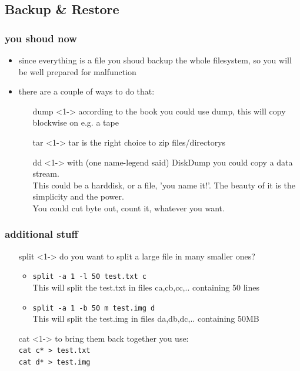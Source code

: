 \documentclass[draft,handout]{beamer}
\newcommand{\code}[1]{\colorbox{lGray}{\texttt{#1}}}
\begin{document}
    \subsection{Backup \& Restore}
	    \begin{frame}
			\frametitle{you shoud now}
			\begin{itemize}
                \item<1-> since everything is a file you shoud backup the whole
                filesystem, so you will be well prepared for malfunction
                \item<1-> there are a couple of ways to do that:
                \begin{itemize}
                    \item[dump]<1-> according to the book you could use dump,
                                    this will copy blockwise on e.g. a tape
                    \item[tar]<1-> tar is the right choice to zip files/directorys
                    \item[dd]<1-> with (one name-legend said) DiskDump you could copy a data stream.\\
                    This could be a harddisk, or a file, 'you name it!'. The beauty of it is the simplicity and the power. \\
                    You could cut byte out, count it, whatever you want.
                \end{itemize}
            \end{itemize}
		\end{frame}
        \begin{frame}
            \frametitle{additional stuff}
			\begin{itemize}
                \item[split]<1-> do you want to split a large file in many smaller ones?
                \begin{itemize}
                    \item<1-> \code{split -a 1 -l 50 test.txt c} \\
                        This will split the test.txt in files ca,cb,cc,.. containing 50 lines
                    \item<1-> \code{split -a 1 -b 50 m test.img d} \\
                        This will split the test.img in files da,db,dc,.. containing 50MB
                \end{itemize}
                \item[cat]<1-> to bring them back together you use: \\
                            \code{cat c* > test.txt} \\
                            \code{cat d* > test.img} \\
			\end{itemize}
		\end{frame}
\end{document}
